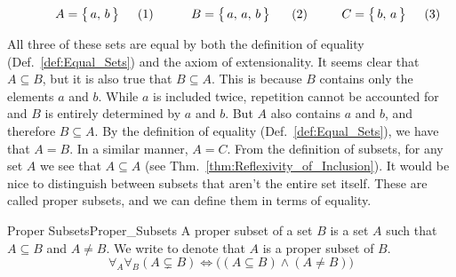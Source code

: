         \begin{subequations}
            \begin{minipage}[b]{0.31\textwidth}
                \centering
                \begin{equation}
                    A=\big\{\,a,\,b\,\big\}
                \end{equation}
            \end{minipage}
            \hfill
            \begin{minipage}[b]{0.36\textwidth}
                \centering
                \begin{equation}
                    B=\big\{\,a,\,a,\,b\,\big\}
                \end{equation}
            \end{minipage}
            \hfill
            \begin{minipage}[b]{0.31\textwidth}
                \centering
                \begin{equation}
                    C=\big\{\,b,\,a\,\big\}
                \end{equation}
            \end{minipage}
        \end{subequations}
        \par\vspace{2.5ex}
        All three of these sets are equal by both the definition of equality
        (Def.~\ref{def:Equal_Sets}) and the axiom of
        extensionality. It seems clear that
        $A\subseteq{B}$, but it is also true that $B\subseteq{A}$. This is
        because $B$ contains only the elements $a$ and $b$. While $a$ is
        included twice, repetition cannot be accounted for and $B$ is entirely
        determined by $a$ and $b$. But $A$ also contains $a$ and $b$, and
        therefore $B\subseteq{A}$. By the definition of equality
        (Def.~\ref{def:Equal_Sets}), we have that $A=B$. In a similar manner,
        $A=C$. From the definition of subsets, for any set $A$ we see that
        $A\subseteq{A}$ (see Thm.~\ref{thm:Reflexivity_of_Inclusion}). It would
        be nice to distinguish between subsets that aren't the entire set
        itself. These are called proper subsets, and
        we can define them in terms of equality.
        \begin{fdefinition}{Proper Subsets}{Proper_Subsets}
            A \gls{proper subset} of a \gls{set} $B$ is a set $A$ such that
            $A\subseteq{B}$ and $A\ne{B}$. We write
             to denote that $A$ is a proper
            subset of $B$.
            \begin{equation*}
                \forall_{A}\forall_{B}(A\subsetneq{B})
                \Longleftrightarrow\Big((A\subseteq{B})\land(A\ne{B})\Big)
            \end{equation*}
        \end{fdefinition}

